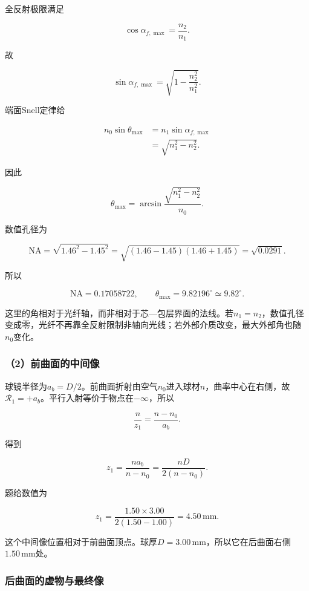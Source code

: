 \documentclass[12pt,a4paper,fontset=fandol]{ctexart}
\begin{document}
全反射极限满足

\[
\cos\alpha_{f,\max}=\frac{n_2}{n_1}.
\]

故

\[
\sin\alpha_{f,\max}
=\sqrt{1-\frac{n_2^2}{n_1^2}}.
\]

端面Snell定律给

\[
\begin{aligned}
n_0\sin\theta_{\max}
&=n_1\sin\alpha_{f,\max}\\
&=\sqrt{n_1^2-n_2^2}.
\end{aligned}
\]

因此

\[
\boxed{\theta_{\max}
=\arcsin\frac{\sqrt{n_1^2-n_2^2}}{n_0}}.
\]

数值孔径为

\[
\mathrm{NA}
=\sqrt{1.46^2-1.45^2}
=\sqrt{(1.46-1.45)(1.46+1.45)}
=\sqrt{0.0291}.
\]

所以

\[
\mathrm{NA}=0.17058722,
\qquad
\boxed{\theta_{\max}=9.82196^\circ\simeq9.82^\circ}.
\]

这里的角相对于光纤轴，而非相对于芯---包层界面的法线。若\(n_1=n_2\)，数值孔径变成零，光纤不再靠全反射限制非轴向光线；若外部介质改变，最大外部角也随\(n_0\)变化。

\subsubsection{（2）前曲面的中间像}\label{ux524dux66f2ux9762ux7684ux4e2dux95f4ux50cf}

球镜半径为\(a_b=D/2\)。前曲面折射由空气\(n_0\)进入球材\(n\)，曲率中心在右侧，故\(\mathcal R_1=+a_b\)。平行入射等价于物点在\(-\infty\)，所以

\[
\frac{n}{z_1}
=\frac{n-n_0}{a_b}.
\]

得到

\[
\boxed{
z_1=\frac{na_b}{n-n_0}
=\frac{nD}{2(n-n_0)}}.
\]

题给数值为

\[
z_1=\frac{1.50\times3.00}
{2(1.50-1.00)}
=4.50\,\mathrm{mm}.
\]

这个中间像位置相对于前曲面顶点。球厚\(D=3.00\,\mathrm{mm}\)，所以它在后曲面右侧\(1.50\,\mathrm{mm}\)处。

\subsubsection{后曲面的虚物与最终像}\label{ux540eux66f2ux9762ux7684ux865aux7269ux4e0eux6700ux7ec8ux50cf}
\end{document}
